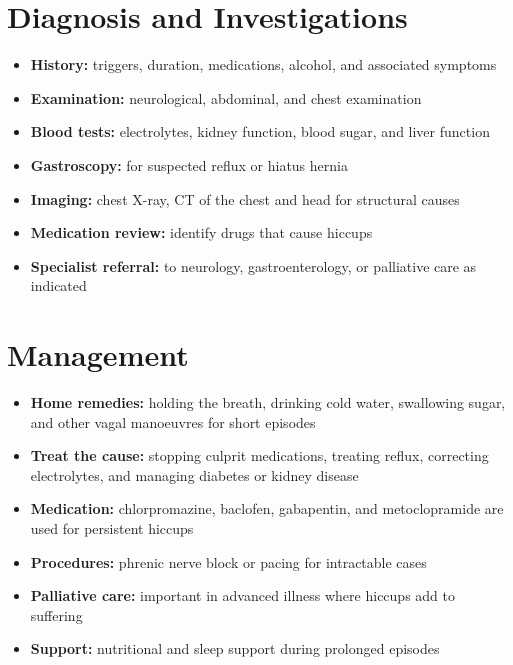 \section*{Diagnosis and Investigations}
\begin{itemize}
    \item \textbf{History:} triggers, duration, medications, alcohol, and associated symptoms
    \item \textbf{Examination:} neurological, abdominal, and chest examination
    \item \textbf{Blood tests:} electrolytes, kidney function, blood sugar, and liver function
    \item \textbf{Gastroscopy:} for suspected reflux or hiatus hernia
    \item \textbf{Imaging:} chest X-ray, CT of the chest and head for structural causes
    \item \textbf{Medication review:} identify drugs that cause hiccups
    \item \textbf{Specialist referral:} to neurology, gastroenterology, or palliative care as indicated
\end{itemize}

\section*{Management}
\begin{itemize}
    \item \textbf{Home remedies:} holding the breath, drinking cold water, swallowing sugar, and other vagal manoeuvres for short episodes
    \item \textbf{Treat the cause:} stopping culprit medications, treating reflux, correcting electrolytes, and managing diabetes or kidney disease
    \item \textbf{Medication:} chlorpromazine, baclofen, gabapentin, and metoclopramide are used for persistent hiccups
    \item \textbf{Procedures:} phrenic nerve block or pacing for intractable cases
    \item \textbf{Palliative care:} important in advanced illness where hiccups add to suffering
    \item \textbf{Support:} nutritional and sleep support during prolonged episodes
\end{itemize}

